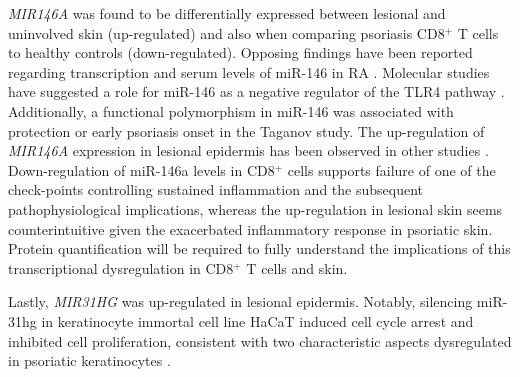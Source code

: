 \textit{MIR146A} was found to be differentially expressed between lesional and uninvolved skin (up-regulated) and also when comparing psoriasis CD8$^+$ T cells to healthy controls (down-regulated). Opposing findings have been reported regarding transcription and serum levels of miR-146 in RA \parencite{Filkova2014,Ele-Refaei2015,Churov2015}. Molecular studies have suggested a role for miR-146 as a negative regulator of the TLR4 pathway \parencite{Taganov2006}. Additionally, a functional polymorphism in miR-146 was associated with protection or early psoriasis onset in the Taganov study.  %
The up-regulation of \textit{MIR146A} expression in lesional epidermis has been observed in other studies \parencite{Tsoi2015,Li2014}. %
Down-regulation of miR-146a levels in CD8$^+$ cells supports failure of one of the check-points controlling sustained inflammation and the subsequent pathophysiological implications, whereas the up-regulation in lesional skin seems counterintuitive given the exacerbated inflammatory response in psoriatic skin. Protein quantification will be required to fully understand the implications of this transcriptional dysregulation in CD8$^+$ T cells and skin. 

Lastly, \textit{MIR31HG} was up-regulated in lesional epidermis. Notably, silencing miR-31hg in keratinocyte immortal cell line HaCaT induced cell cycle arrest and inhibited cell proliferation, consistent with two characteristic aspects dysregulated in psoriatic keratinocytes \parencite{Gao2018}.

